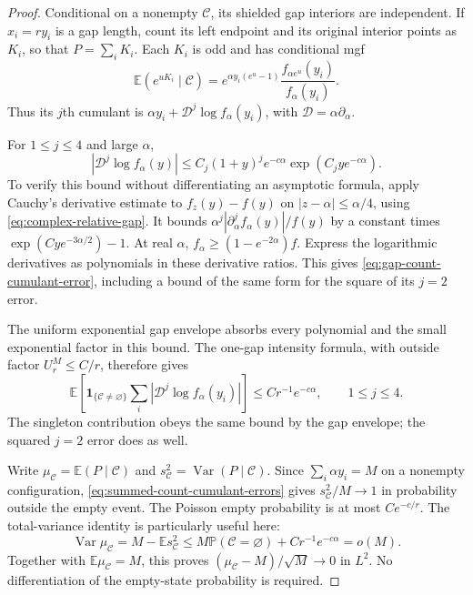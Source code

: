 \documentclass[11pt,letterpaper]{article}
\newcommand{\PP}{\mathbb P}\newcommand{\EE}{\mathbb E}
\newcommand{\ind}{\mathbf 1}\newcommand{\Exp}{\operatorname{Exp}}
\begin{document}
\begin{proof}
Conditional on a nonempty $\mathcal C$, its shielded gap interiors
are independent. If $x_i=ry_i$ is a gap length, count its left
endpoint and its original interior points as $K_i$, so that
$P=\sum_iK_i$. Each $K_i$ is odd and has conditional mgf
\begin{equation}\label{eq:conditional-gap-count-mgf}
 \EE(e^{uK_i}\mid\mathcal C)
  =e^{\alpha y_i(e^u-1)}
                       \frac{f_{\alpha e^u}(y_i)}{f_\alpha(y_i)}.
\end{equation}
Thus its $j$th cumulant is
$\alpha y_i+\mathcal D^j\log f_\alpha(y_i)$, with
$\mathcal D=\alpha\partial_\alpha$.

For $1\le j\le4$ and large $\alpha$,
\begin{equation}\label{eq:gap-count-cumulant-error}
 |\mathcal D^j\log f_\alpha(y)|
 \le C_j(1+y)^j e^{-c\alpha}
                         \exp(C_j y e^{-c\alpha}).
\end{equation}
To verify this bound without differentiating an asymptotic
formula, apply Cauchy's derivative estimate to
$f_z(y)-f(y)$ on $|z-\alpha|\le\alpha/4$, using
\eqref{eq:complex-relative-gap}. It bounds
$\alpha^j|\partial_\alpha^j f_\alpha(y)|/f(y)$ by a constant
times $\exp(Cy e^{-3\alpha/2})-1$. At real $\alpha$,
$f_\alpha\ge(1-e^{-2\alpha})f$. Express the logarithmic
derivatives as polynomials in these derivative ratios. This
gives \eqref{eq:gap-count-cumulant-error}, including a bound of
the same form for the square of its $j=2$ error.

The uniform exponential gap envelope absorbs every polynomial
and the small exponential factor in this bound. The one-gap
intensity formula, with outside factor $U_r^M\le C/r$, therefore
gives
\begin{equation}\label{eq:summed-count-cumulant-errors}
 \EE\left[\ind_{\{\mathcal C\ne\varnothing\}}
       \sum_i|\mathcal D^j\log f_\alpha(y_i)|\right]
                \le Cr^{-1}e^{-c\alpha},\qquad 1\le j\le4.
\end{equation}
The singleton contribution obeys the same bound by the gap
envelope; the squared $j=2$ error does as well.

Write $\mu_{\mathcal C}=\EE(P\mid\mathcal C)$ and
$s_{\mathcal C}^2=\operatorname{Var}(P\mid\mathcal C)$.
Since $\sum_i\alpha y_i=M$ on a nonempty configuration,
\eqref{eq:summed-count-cumulant-errors} gives
$s_{\mathcal C}^2/M\to1$ in probability outside the empty event.
The Poisson empty probability is at most $Ce^{-c/r}$.
The total-variance identity is particularly useful here:
\[
 \operatorname{Var}\mu_{\mathcal C}
   =M-\EE s_{\mathcal C}^2
   \le M\PP(\mathcal C=\varnothing)+Cr^{-1}e^{-c\alpha}=o(M).
\]
Together with $\EE\mu_{\mathcal C}=M$, this proves
$(\mu_{\mathcal C}-M)/\sqrt M\to0$ in $L^2$.
No differentiation of the empty-state probability is required.


\end{proof}
\end{document}

